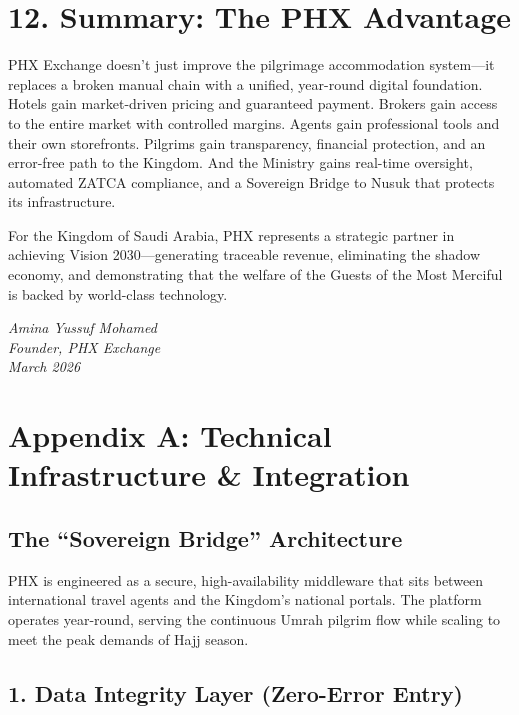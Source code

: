\documentclass[11pt,a4paper]{article}
\begin{document}
\section*{12. Summary: The PHX Advantage}


PHX Exchange doesn't just improve the pilgrimage accommodation system---it replaces a broken manual chain with a unified, year-round digital foundation. Hotels gain market-driven pricing and guaranteed payment. Brokers gain access to the entire market with controlled margins. Agents gain professional tools and their own storefronts. Pilgrims gain transparency, financial protection, and an error-free path to the Kingdom. And the Ministry gains real-time oversight, automated ZATCA compliance, and a Sovereign Bridge to Nusuk that protects its infrastructure.

For the Kingdom of Saudi Arabia, PHX represents a strategic partner in achieving Vision 2030---generating traceable revenue, eliminating the shadow economy, and demonstrating that the welfare of the Guests of the Most Merciful is backed by world-class technology.


\vspace{1.5cm}

\begin{center}
\textit{Amina Yussuf Mohamed}\\
\textit{Founder, PHX Exchange}\\
\textit{March 2026}
\end{center}

\newpage


\section*{Appendix A: Technical Infrastructure \& Integration}

\subsection*{The ``Sovereign Bridge'' Architecture}


PHX is engineered as a secure, high-availability middleware that sits between international travel agents and the Kingdom's national portals. The platform operates year-round, serving the continuous Umrah pilgrim flow while scaling to meet the peak demands of Hajj season.


\subsection*{1. Data Integrity Layer (Zero-Error Entry)}
\end{document}
